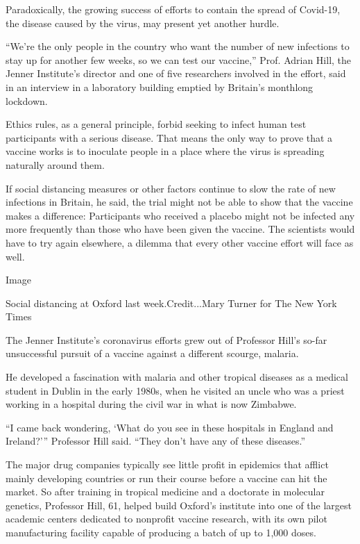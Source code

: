 Paradoxically, the growing success of efforts to contain the spread of
Covid-19, the disease caused by the virus, may present yet another
hurdle.

``We're the only people in the country who want the number of new
infections to stay up for another few weeks, so we can test our
vaccine,'' Prof. Adrian Hill, the Jenner Institute's director and one of
five researchers involved in the effort, said in an interview in a
laboratory building emptied by Britain's monthlong lockdown.

Ethics rules, as a general principle, forbid seeking to infect human
test participants with a serious disease. That means the only way to
prove that a vaccine works is to inoculate people in a place where the
virus is spreading naturally around them.

If social distancing measures or other factors continue to slow the rate
of new infections in Britain, he said, the trial might not be able to
show that the vaccine makes a difference: Participants who received a
placebo might not be infected any more frequently than those who have
been given the vaccine. The scientists would have to try again
elsewhere, a dilemma that every other vaccine effort will face as well.

Image

Social distancing at Oxford last week.Credit...Mary Turner for The New
York Times

The Jenner Institute's coronavirus efforts grew out of Professor Hill's
so-far unsuccessful pursuit of a vaccine against a different scourge,
malaria.

He developed a fascination with malaria and other tropical diseases as a
medical student in Dublin in the early 1980s, when he visited an uncle
who was a priest working in a hospital during the civil war in what is
now Zimbabwe.

``I came back wondering, `What do you see in these hospitals in England
and Ireland?''' Professor Hill said. ``They don't have any of these
diseases.''

The major drug companies typically see little profit in epidemics that
afflict mainly developing countries or run their course before a vaccine
can hit the market. So after training in tropical medicine and a
doctorate in molecular genetics, Professor Hill, 61, helped build
Oxford's institute into one of the largest academic centers dedicated to
nonprofit vaccine research, with its own pilot manufacturing facility
capable of producing a batch of up to 1,000 doses.

